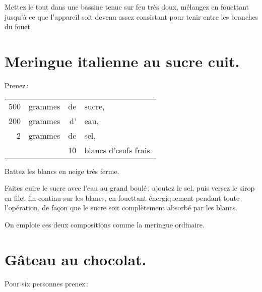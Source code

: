 Mettez le tout dans une bassine tenue sur feu très doux, mélangez en fouettant
jusqu'à ce que l'appareil soit devenu assez consistant pour tenir entre les
branches du fouet.

\section*{\centering Meringue italienne au sucre cuit.}
{}

Prenez :

\footnotesize
\begin{longtable}{rrrp{16em}}
    500 & grammes & de & sucre,                                                                           \\
    200 & grammes & d' & eau,                                                                             \\
      2 & grammes & de & sel,                                                                             \\
        &         & 10 & blancs d'œufs frais.                                                             \\
\end{longtable}
\normalsize

Battez les blancs en neige très ferme.

Faites cuire le sucre avec l'eau au grand boulé ; ajoutez le sel, puis versez le
sirop en filet fin continu sur les blancs, en fouettant énergiquement pendant toute
l'opération, de façon que le sucre soit complètement absorbé par les blancs.

\sk

On emploie ces deux compositions comme la meringue ordinaire.

\section*{\centering Gâteau au chocolat.}
{}

Pour six personnes prenez :

